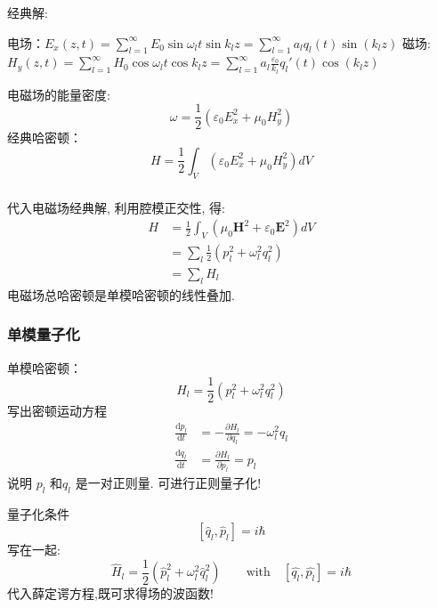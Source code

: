 \begin{frame}
      \frametitle{}
    经典解:
      \begin{enumerate}
        \IItem 电场：$\displaystyle E_{x}(z,t) = \sum\limits_{l=1}^{\infty } E_{0}  \sin \omega_l t \sin k_l z= \sum\limits_{l=1}^{\infty } a_l q_l (t) \sin (k_l z)$
        \IItem 磁场: $\displaystyle H_{y}(z,t) = \sum\limits_{l=1}^{\infty } H_{0}  \cos \omega_l t \cos k_l z = \sum\limits_{l=1}^{\infty } a_l \frac{\varepsilon_0}{k_l}q_l ' (t) \cos (k_l z)$  
    \end{enumerate}	  
    电磁场的能量密度: 
    \[ \omega = \frac{1}{2} (\varepsilon_0 E^2 _x + \mu_0 H^2 _y) \]
    经典哈密顿：
    \[ H = \frac{1}{2} \int_V (\varepsilon_0 E^2 _x + \mu_0 H^2 _y) dV \] 
\end{frame}

\begin{frame}
      \frametitle{}
    代入电磁场经典解, 利用腔模正交性, 得:
    \[ \begin{aligned}
        H &= \frac{1}{2} \int_V (\mu_0 \mathbf{H}^2 + \varepsilon_0 \mathbf{E}^2) dV \\ 
        &= \sum_l  \frac{1}{2}(p_l ^2 + \omega_l ^2 q_l ^2 ) \\ 
        &= \sum_l H_l  
     \end{aligned} 
    \] 
    电磁场总哈密顿是单模哈密顿的线性叠加.
\end{frame}

\begin{frame}
      \frametitle{单模量子化}
      单模哈密顿：
      \[ H_l  =  \frac{1}{2}(p_l ^2 + \omega_l ^2 q_l ^2 ) \]
      写出密顿运动方程
    \[ \begin{aligned}
        \frac{\mathrm{d}p_l}{\mathrm{d}t} &= - \frac{\partial H_l}{\partial q_l} = - \omega ^2 _l q_l \\ 
        \frac{\mathrm{d}q_l}{\mathrm{d}t} &= \frac{\partial H_l}{\partial p_l} =p_l
        \end{aligned} 
    \] 
    说明 $ p_l $ 和$q_l$ 是一对正则量.  可进行正则量子化!
\end{frame}

\begin{frame}    
    量子化条件
    \[  [\hat{q}_l,\hat{p}_l]=i\hbar \] 
    写在一起:
    \[ \hat{H}_l  =  \frac{1}{2}(\hat{p}_l ^2 + \omega_l ^2 \hat{q}_l ^2 )  \qquad \text{with} \quad [\hat{q_l},\hat{p_l}] =i\hbar\] 
    代入薛定谔方程,既可求得场的波函数! \\ {\vspace*{1em}}
  \end{frame}
  
